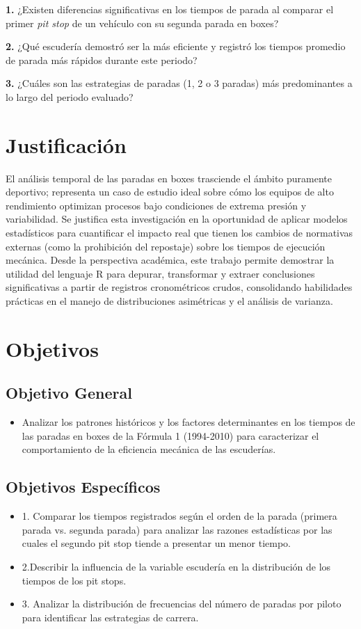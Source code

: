 \documentclass[oneside,11pt]{Latex/Classes/PhDthesisPSnPDF}
\begin{document}
\textbf{1.} ¿Existen diferencias significativas en los tiempos de parada
al comparar el primer \emph{pit stop} de un vehículo con su segunda
parada en boxes?

\textbf{2.} ¿Qué escudería demostró ser la más eficiente y registró los
tiempos promedio de parada más rápidos durante este periodo?

\textbf{3.} ¿Cuáles son las estrategias de paradas (1, 2 o 3 paradas)
más predominantes a lo largo del periodo evaluado?

\section{Justificación}

El análisis temporal de las paradas en boxes trasciende el ámbito
puramente deportivo; representa un caso de estudio ideal sobre cómo los
equipos de alto rendimiento optimizan procesos bajo condiciones de
extrema presión y variabilidad. Se justifica esta investigación en la
oportunidad de aplicar modelos estadísticos para cuantificar el impacto
real que tienen los cambios de normativas externas (como la prohibición
del repostaje) sobre los tiempos de ejecución mecánica. Desde la
perspectiva académica, este trabajo permite demostrar la utilidad del
lenguaje R para depurar, transformar y extraer conclusiones
significativas a partir de registros cronométricos crudos, consolidando
habilidades prácticas en el manejo de distribuciones asimétricas y el
análisis de varianza.

\section{Objetivos}

\subsection{Objetivo General}
\begin{itemize}
  \item{Analizar los patrones históricos y los factores determinantes en los tiempos de las paradas en boxes de la Fórmula 1 (1994-2010) para caracterizar el comportamiento de la eficiencia mecánica de las escuderías.}
\end{itemize}

\subsection{Objetivos Específicos}
\begin{itemize}
  \item{1. Comparar los tiempos registrados según el orden de la parada (primera parada vs. segunda parada) para analizar las razones estadísticas por las cuales el segundo pit stop tiende a presentar un menor tiempo. }
  \item{2.Describir la influencia de la variable escudería en la distribución de los tiempos de los pit stops. }
  \item{3. Analizar la distribución de frecuencias del número de paradas por piloto para identificar las estrategias de carrera.}
\end{itemize}
\end{document}
